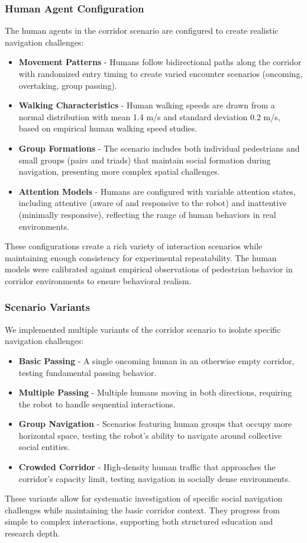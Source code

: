 \subsubsection{Human Agent Configuration}
The human agents in the corridor scenario are configured to create realistic navigation 
challenges:
\begin{itemize}
    \item \textbf{Movement Patterns} - Humans follow bidirectional paths along the corridor with 
    randomized entry timing to create varied encounter scenarios (oncoming, overtaking, group passing).
    \item \textbf{Walking Characteristics} - Human walking speeds are drawn from a normal 
    distribution with mean 1.4 m/s and standard deviation 0.2 m/s, based on empirical 
    human walking speed studies.
    \item \textbf{Group Formations} - The scenario includes both individual pedestrians and 
    small groups (pairs and triads) that maintain social formation during navigation, 
    presenting more complex spatial challenges.
    \item \textbf{Attention Models} - Humans are configured with variable attention states, 
    including attentive (aware of and responsive to the robot) and inattentive 
    (minimally responsive), reflecting the range of human behaviors in real environments.
\end{itemize}
These configurations create a rich variety of interaction scenarios while maintaining enough 
consistency for experimental repeatability. The human models were calibrated against empirical 
observations of pedestrian behavior in corridor environments to ensure behavioral realism.

\subsubsection{Scenario Variants}
We implemented multiple variants of the corridor scenario to isolate specific 
navigation challenges:
\begin{itemize}
    \item \textbf{Basic Passing}     - A single oncoming human in an otherwise empty corridor, 
    testing fundamental passing behavior.
    \item \textbf{Multiple Passing} - Multiple humans moving in both directions, requiring 
    the robot to handle sequential interactions.
    \item \textbf{Group Navigation} - Scenarios featuring human groups that occupy more 
    horizontal space, testing the robot's ability to navigate around collective social entities.
    \item \textbf{Crowded Corridor} - High-density human traffic that approaches the 
    corridor's capacity limit, testing navigation in socially dense environments.
\end{itemize}
These variants allow for systematic investigation of specific social navigation challenges
while maintaining the basic corridor context. They progress from simple to complex 
interactions, supporting both structured education and research depth.

